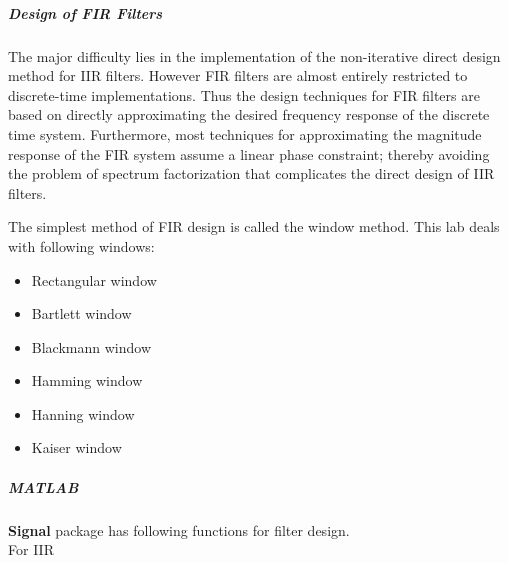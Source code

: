 \documentclass[12pt]{article}
\begin{document}
\subparagraph{Design of FIR Filters\\}
The major difficulty lies in the implementation of the non-iterative direct design method for IIR
filters. However FIR filters are almost entirely restricted to discrete-time implementations. Thus
the design techniques for FIR filters are based on directly approximating the desired frequency
response of the discrete time system. Furthermore, most techniques for approximating the
magnitude response of the FIR system assume a linear phase constraint; thereby avoiding the
problem of spectrum factorization that complicates the direct design of IIR filters.

The simplest method of FIR design is called the window method. This lab deals with following windows:
\begin{itemize}
    \item Rectangular window
    \item Bartlett window
    \item Blackmann window
    \item Hamming window
    \item Hanning window
    \item Kaiser window
\end{itemize}
\subparagraph{MATLAB\\}
{\bfseries Signal} package has following functions for filter design.\\
{\large For IIR}
\end{document}
